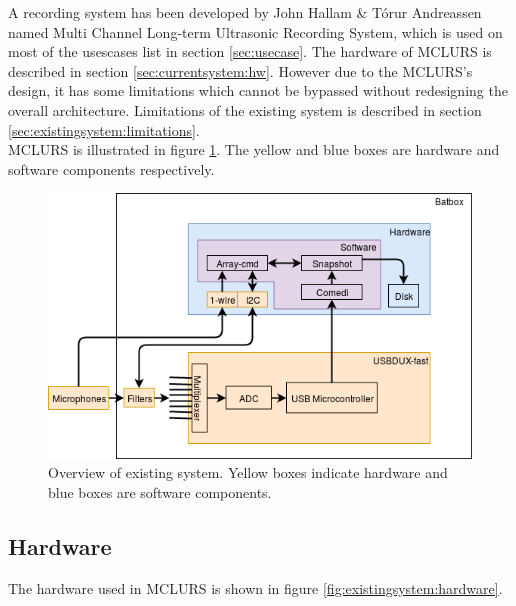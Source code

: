 A recording system has been developed by John Hallam \& T{\'o}rur Andreassen \citep{andreassen2013ultrasonic} named Multi Channel Long-term Ultrasonic Recording System, which is used on most of the usescases list in section \ref{sec:usecase}. The hardware of MCLURS is described in section \ref{sec:currentsystem:hw}. 
However due to the MCLURS's design, it has some limitations which cannot be bypassed without redesigning the overall architecture. Limitations of the existing system is described in section \ref{sec:existingsystem:limitations}.\\


MCLURS is illustrated in figure \ref{fig:existingsystem:overview}. The yellow and blue boxes are hardware and software components respectively.
\begin{figure}[h!]
	\centering
	\includegraphics[width=1\textwidth]{figures/existing-system-overview.png} 
	\caption{Overview of existing system. Yellow boxes indicate hardware and blue boxes are software components.}\label{fig:existingsystem:overview}
\end{figure}


\subsection{Hardware}
The hardware used in MCLURS is shown in figure \ref{fig:existingsystem:hardware}.

